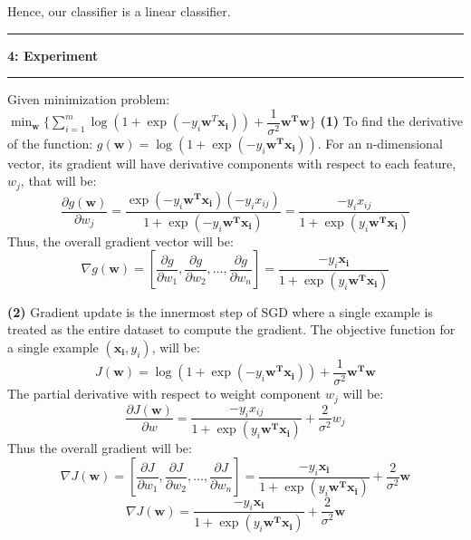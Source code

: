 \documentclass{article}
\newcommand\question[2]{\vspace{.25in}\hrule\textbf{#1: #2}\hrule\vspace{.10in}}
\renewcommand\part[1]{\vspace{.10in}\textbf{(#1)}}
\begin{document}
	Hence, our classifier is a linear classifier. \newline

	\question{4}{Experiment}
	Given minimization problem: $\min_{\mathbf{w}}\{ \sum_{i=1}^m \log(1 + \exp(-y_i\mathbf{w}^T\mathbf{x_i})) + \dfrac{1}{\sigma^2}\mathbf{w^Tw} \}$
	\part{1} To find the derivative of the function: $g(\mathbf{w}) = \log(1 + \exp(-y_i\mathbf{w^Tx_i}))$. For an n-dimensional vector, its gradient will have derivative components with respect to each feature,$w_j$, that will be:
	\[ \dfrac{\partial g(\mathbf{w})}{\partial w_j} = \dfrac{\exp(-y_i\mathbf{w^Tx_i})(-y_ix_{ij})}{1 + \exp(-y_i\mathbf{w^Tx_i})} = \dfrac{-y_ix_{ij}}{1 + \exp(y_i\mathbf{w^Tx_i})}\]
	Thus, the overall gradient vector will be:
	\[\nabla g(\mathbf{w}) = [\dfrac{\partial g}{\partial w_1},\dfrac{\partial g}{\partial w_2}, \dots, \dfrac{\partial g}{\partial w_n}] = \dfrac{-y_i\mathbf{x_i}}{1 + \exp(y_i\mathbf{w^Tx_i})}\]

	\part{2} Gradient update is the innermost step of SGD where a single example is treated as the entire dataset to compute the gradient. The objective function for a single example $(\mathbf{x_i},y_i)$, will be:
	\[ J(\mathbf{w}) = \log(1 + \exp(-y_i\mathbf{w^Tx_i})) + \dfrac{1}{\sigma^2}\mathbf{w^Tw} \]
	The partial derivative with respect to weight component $w_j$ will be:
	\[ \dfrac{\partial J(\mathbf{w})}{\partial w} = \dfrac{-y_ix_{ij}}{1 + \exp(y_i\mathbf{w^Tx_i})} + \dfrac{2}{\sigma^2}w_j \]
	Thus the overall gradient will be:
	\[\nabla J(\mathbf{w}) = [\dfrac{\partial J}{\partial w_1},\dfrac{\partial J}{\partial w_2}, \dots, \dfrac{\partial J}{\partial w_n}] = \dfrac{-y_i\mathbf{x_i}}{1 + \exp(y_i\mathbf{w^Tx_i})} + \dfrac{2}{\sigma^2}\mathbf{w}  \]
	\begin{equation}
	\nabla J(\mathbf{w}) = \dfrac{-y_i\mathbf{x_i}}{1 + \exp(y_i\mathbf{w^Tx_i})} + \dfrac{2}{\sigma^2}\mathbf{w} 
		\label{eq:grad}
	\end{equation}
\end{document}
